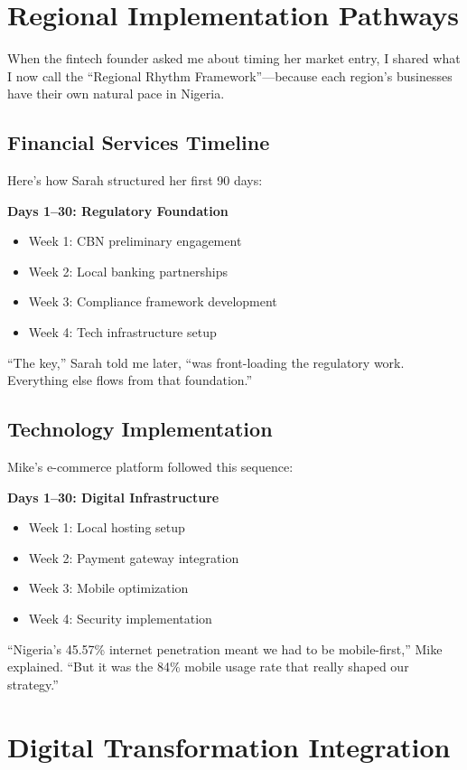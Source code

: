 \section{Regional Implementation Pathways}\label{sec:regional-pathways}

When the fintech founder asked me about timing her market entry, I shared what I now call the ``Regional Rhythm Framework''—because each region's businesses have their own natural pace in Nigeria.

\subsection{Financial Services Timeline}\label{subsec:financial-timeline}
Here's how Sarah structured her first 90 days:

\textbf{Days 1–30: Regulatory Foundation}
\begin{itemize}
    \item Week 1: CBN preliminary engagement
    \item Week 2: Local banking partnerships
    \item Week 3: Compliance framework development
    \item Week 4: Tech infrastructure setup
\end{itemize}

``The key,'' Sarah told me later, ``was front-loading the regulatory work. Everything else flows from that foundation.''

\subsection{Technology Implementation}\label{subsec:tech-implementation}
Mike's e-commerce platform followed this sequence:

\textbf{Days 1--30: Digital Infrastructure}
\begin{itemize}
    \item Week 1: Local hosting setup
    \item Week 2: Payment gateway integration
    \item Week 3: Mobile optimization
    \item Week 4: Security implementation
\end{itemize}

``Nigeria's 45.57\% internet penetration meant we had to be mobile-first,'' Mike explained. ``But it was the 84\% mobile usage rate that really shaped our strategy.''

\section{Digital Transformation Integration}\label{sec:digital-transformation-integration}

